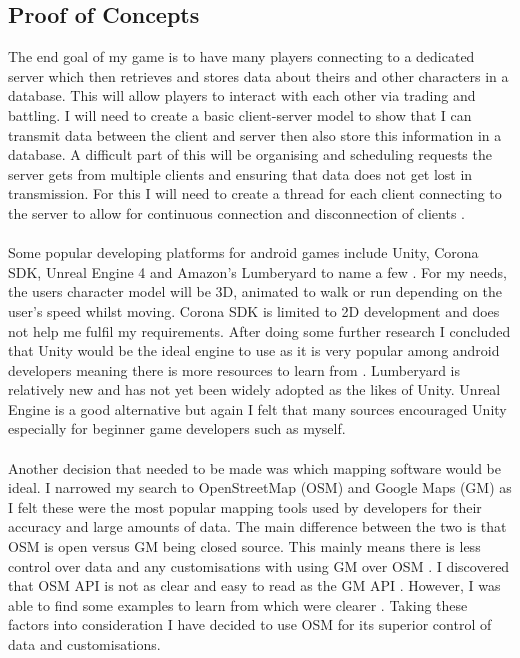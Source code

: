 \documentclass[a4paper]{report}
\begin{document}
\subsection{Proof of Concepts}
The end goal of my game is to have many players connecting to a dedicated server which then retrieves and stores data about theirs and other characters in a database. This will allow players to interact with each other via trading and battling. I will need to create a basic client-server model to show that I can transmit data between the client and server then also store this information in a database. A difficult part of this will be organising and scheduling requests the server gets from multiple clients and ensuring that data does not get lost in transmission. For this I will need to create a thread for each client connecting to the server to allow for continuous connection and disconnection of clients \cite{MultiClient}.  
\\\\
Some popular developing platforms for android games include Unity, Corona SDK, Unreal Engine 4 and Amazon's Lumberyard to name a few \cite{Engines}. For my needs, the users character model will be 3D, animated to walk or run depending on the user’s speed whilst moving. Corona SDK is limited to 2D development and does not help me fulfil my requirements. After doing some further research I concluded that Unity would be the ideal engine to use as it is very popular among android developers meaning there is more resources to learn from \cite{Unity}. Lumberyard is relatively new and has not yet been widely adopted as the likes of Unity. Unreal Engine is a good alternative but again I felt that many sources encouraged Unity especially for beginner game developers such as myself. 
\\\\
Another decision that needed to be made was which mapping software would be ideal. I narrowed my search to OpenStreetMap (OSM) and Google Maps (GM) as I felt these were the most popular mapping tools used by developers for their accuracy and large amounts of data. The main difference between the two is that OSM is open versus GM being closed source. This mainly means there is less control over data and any customisations with using GM over OSM \cite{Maps}. I discovered that OSM API is not as clear and easy to read as the GM API \cite{API}. However, I was able to find some examples to learn from which were clearer \cite{github}. Taking these factors into consideration I have decided to use OSM for its superior control of data and customisations.
\end{document}
